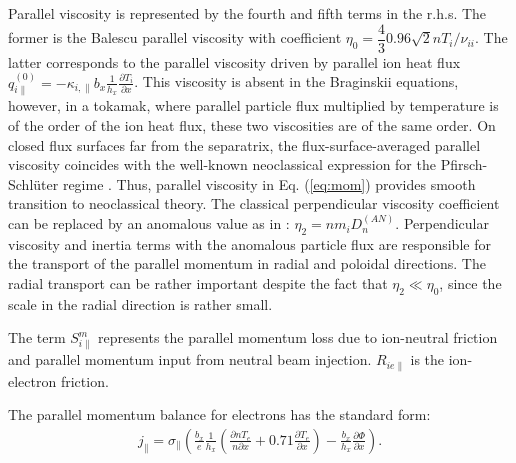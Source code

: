 \documentclass[a4paper,10pt]{report}
\begin{document}
Parallel viscosity is represented
by the fourth and fifth terms in the r.h.s.
The former is the Balescu
parallel viscosity with coefficient $\eta _0 = \dfrac{4}{3} 0.96 \sqrt{2} n T_i / \nu_{ii}$.
The latter corresponds to the parallel viscosity driven
by parallel ion heat flux
$q_{i\parallel}^{\left( 0 \right)} =
- \kappa _{i,\parallel} b_x \frac{1}{h_x} \frac{\partial T_i}{\partial x}$.
This viscosity is absent in the Braginskii equations, however, in a tokamak,
where parallel particle flux multiplied by temperature is of
the order of the ion heat flux, these two
viscosities are of the same order. On closed flux surfaces far from
the separatrix, the flux-surface-averaged parallel
viscosity coincides with the well-known
neoclassical expression for the Pfirsch-Schl{\"u}ter regime
\cite{HIRSHMAN81A}.
Thus, parallel viscosity in Eq. (\ref{eq:mom}) provides smooth transition to
neoclassical theory.
The classical perpendicular viscosity coefficient
can
be replaced by an anomalous value as in
\cite{ROGNLIEN98A, ROGNLIEN98B, ROGNLIEN99A}: $\eta _2 =
n m_i D^{(AN)}_n$. Perpendicular viscosity and inertia terms with the
anomalous particle flux are responsible for the transport of the
parallel momentum in radial and poloidal directions. The radial transport
can be rather important despite the fact that $\eta_2 \ll \eta _0$, since
the scale in the radial direction is rather small.

The term  $S_{i \parallel}^m$  represents the parallel momentum loss due to
ion-neutral friction and parallel momentum input from neutral beam injection.
$R_{ie\parallel}$ is the ion-electron friction.

The parallel momentum balance for electrons has the standard form:
\begin{gather}
j_{\parallel} = \sigma _{\parallel} \left(
\frac{b_x}{e} \frac{1}{h_x} \left( \frac{\partial n T_e}{n \partial x} +
0.71 \frac{\partial T_e}{\partial x} \right)
- \frac{b_x}{h_x} \frac{\partial \Phi}{\partial x} \right).
\end{gather}
\end{document}
